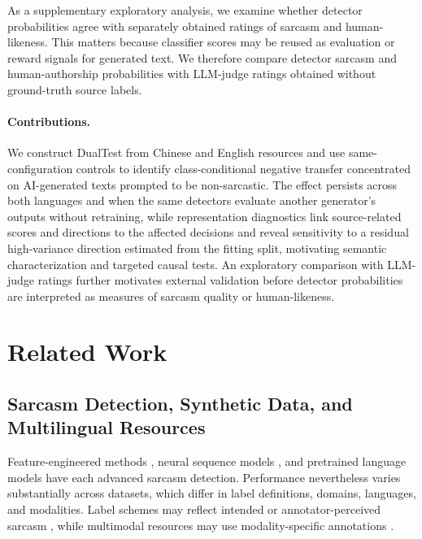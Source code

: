 \documentclass[11pt]{article}
\begin{document}
As a supplementary exploratory analysis, we examine whether detector probabilities agree with separately obtained ratings of sarcasm and human-likeness. This matters because classifier scores may be reused as evaluation or reward signals for generated text. We therefore compare detector sarcasm and human-authorship probabilities with LLM-judge ratings obtained without ground-truth source labels.

\paragraph{Contributions.} We construct DualTest from Chinese and English resources and use same-configuration controls to identify class-conditional negative transfer concentrated on AI-generated texts prompted to be non-sarcastic. The effect persists across both languages and when the same detectors evaluate another generator's outputs without retraining, while representation diagnostics link source-related scores and directions to the affected decisions and reveal sensitivity to a residual high-variance direction estimated from the fitting split, motivating semantic characterization and targeted causal tests. An exploratory comparison with LLM-judge ratings further motivates external validation before detector probabilities are interpreted as measures of sarcasm quality or human-likeness.

\section{Related Work}
\label{sec:related}

\subsection{Sarcasm Detection, Synthetic Data, and Multilingual Resources}
\label{sec:related-sarcasm}

Feature-engineered methods \citep{riloff2013sarcasm}, neural sequence models \citep{ghosh2016fracking,tay2018reasoning}, and pretrained language models \citep{khatri2020,du2022pali} have each advanced sarcasm detection. Performance nevertheless varies substantially across datasets, which differ in label definitions, domains, languages, and modalities. Label schemes may reflect intended or annotator-perceived sarcasm \citep{oprea2020isarcasm,abufarha2022isarcasmeval,casola2024multipico}, while multimodal resources may use modality-specific annotations \citep{yue2024sarcnet}.
\end{document}
